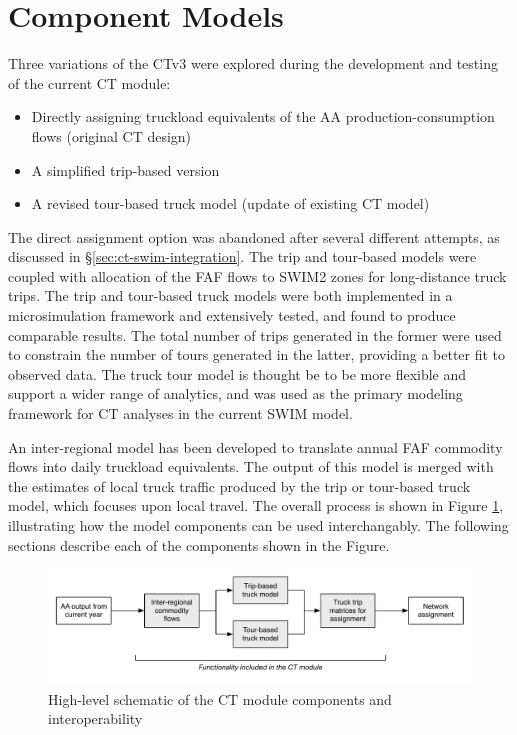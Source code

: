 \section{Component Models}
Three variations of the CTv3 were explored during the development and testing of the current CT module:
\begin{itemize}
\item Directly assigning truckload equivalents of the AA production-consumption flows (original CT design)
\item A simplified trip-based version
\item A revised tour-based truck model (update of existing CT model)
\end{itemize}

\noindent The direct assignment option was abandoned after several different attempts, as discussed in \S\ref{sec:ct-swim-integration}. The trip and tour-based models were coupled with allocation of the FAF flows to SWIM2 zones for long-distance truck trips. The trip and tour-based truck models were both implemented in a microsimulation framework and extensively tested, and found to produce comparable results. The total number of trips generated in the former were used to constrain the number of tours generated in the latter, providing a better fit to observed data. The truck tour model is thought be to be more flexible and support a wider range of analytics, and was used as the primary modeling framework for CT analyses in the current SWIM model.

An inter-regional model has been developed to translate annual FAF commodity flows into daily truckload equivalents. The output of this model is merged with the estimates of local truck traffic produced by the trip or tour-based truck model, which focuses upon local travel. The overall process is shown in Figure \ref{fig:ct-high-level}, illustrating how the model components can be used interchangably. The following sections describe each of the components shown in the Figure.

\begin{figure}
\centering
\includegraphics[width=6.25in, trim=0mm 10mm 0mm 0mm]{ct/ct-high-level}
\caption{High-level schematic of the CT module components and interoperability}
\label{fig:ct-high-level}
\end{figure}

